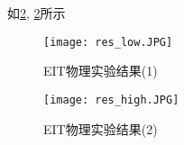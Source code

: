

如\cref{figure:res_high}, \cref{figure:res_high}所示
\begin{figure}[h]
    \centering
    \texttt{[image: res\_low.JPG]}
    \caption{EIT物理实验结果(1)}
    \label{figure:res_low}
\end{figure}

\begin{figure}[h]
    \centering
    \texttt{[image: res\_high.JPG]}
    \caption{EIT物理实验结果(2)}
    \label{figure:res_high}
\end{figure}

